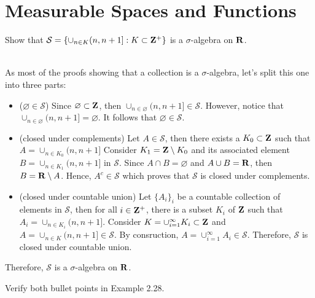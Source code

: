 \section{Measurable Spaces and Functions}

\begin{exercise}
    Show that $\mathcal{S} = \{\cup_{n \in K}(n, n+1]:K\subset\mathbf{Z}^+\}$ is a $\sigma$-algebra on $\mathbf{R}$.\\
\end{exercise}

\begin{solution}
    \\ As most of the proofs showing that a collection is a $\sigma$-algebra, let's split this one into three parts:
    \begin{itemize}
        \item ($\varnothing \in \mathcal{S}$) Since $\varnothing \subset \mathbf{Z}$, then $\cup_{n \in \varnothing}(n, n+1] \in \mathcal{S}$. However, notice that $\cup_{n \in \varnothing}(n, n+1] = \varnothing$. It follows that $\varnothing \in \mathcal{S}$.
        \item (closed under complements) Let $A \in \mathcal{S}$, then there exists a $K_0 \subset \mathbf{Z}$ such that $A = \cup_{n \in K_0}(n, n+1]$
        Consider $K_1 = \mathbf{Z} \setminus K_0$ and its associated element $B = \cup_{n \in K_1}(n, n+1]$ in $\mathcal{S}$. Since $A \cap B = \varnothing$ and $A \cup B = \mathbf{R}$, then $B = \mathbf{R} \setminus A$. Hence, $A^c \in \mathcal{S}$ which proves that $\mathcal{S}$ is closed under complements.
        \item (closed under countable union) Let $\{A_i\}_i$ be a countable collection of elements in $\mathcal{S}$, then for all $i \in \mathbf{Z}^+$, there is a subset $K_i$ of $\mathbf{Z}$ such that $A_i = \cup_{n \in K_i}(n, n+1]$. Consider $K = \cup_{i=1}^{\infty}K_i \subset \mathbf{Z}$ and $A = \cup_{n \in K}(n, n+1] \in \mathcal{S}$. By consruction, $A = \cup_{i=1}^{\infty}A_i \in \mathcal{S}$. Therefore, $\mathcal{S}$ is closed under countable union.
    \end{itemize}
    Therefore, $\mathcal{S}$ is a $\sigma$-algebra on $\mathbf{R}$. \\
\end{solution}

\begin{exercise}
    Verify both bullet points in Example 2.28. \\
\end{exercise}

